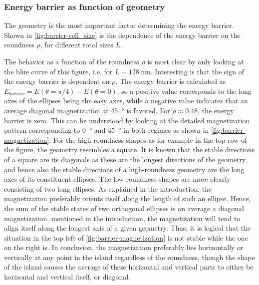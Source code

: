 \documentclass[11pt,a4paper,english]{article}
\begin{document}
\subsubsection{Energy barrier as function of geometry}
The geometry is the most important factor determining the energy barrier. Shown in \cref{fig:barrier-cell_size} is the dependence of the energy barrier on the roundness $\rho$, for different total sizes $L$. \par 
The behavior as a function of the roundness $\rho$ is most clear by only looking at the blue curve of this figure, i.e. for $L=\SI{128}{\nano\metre}$. Interesting is that the sign of the energy barrier is dependent on $\rho$. The energy barrier is calculated as $E_{barrier} = E(\theta=\pi/4) - E(\theta=0)$, so a positive value corresponds to the long axes of the ellipses being the easy axes, while a negative value indicates that an average diagonal magnetization at \SI{45}{\degree} is favored. For $\rho \approx 0.48$, the energy barrier is zero.
This can be understood by looking at the detailed magnetization pattern corresponding to \SI{0}{\degree} and \SI{45}{\degree} in both regimes as shown in \cref{fig:barrier-magnetization}. For the high-roundness shapes as for example in the top row of the figure, the geometry resembles a square. It is known that the stable directions of a square are its diagonals as these are the longest directions of the geometry, and hence also the stable directions of a high-roundness geometry are the long axes of its constituent ellipses. The low-roundness shapes are more clearly consisting of two long ellipses. As explained in the introduction, the magnetization preferably orients itself along the length of such an ellipse. Hence, the sum of the stable states of two orthogonal ellipses is on average a diagonal magnetization. mentioned in the introduction, the magnetization will tend to align itself along the longest axis of a given geometry. Thus, it is logical that the situation in the top left of \cref{fig:barrier-magnetization} is not stable while the one on the right is. In conclusion, the magnetization preferably lies horizontally or vertically at any point in the island regardless of the roundness, though the shape of the island causes the average of these horizontal and vertical parts to either be horizontal and vertical itself, or diagonal.
\end{document}
